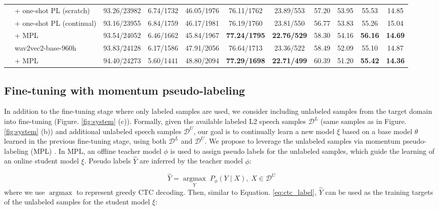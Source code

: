 \documentclass[a4paper]{article}
\begin{document}
\begin{table}[t]
{\begin{tabular}{cl|cc|ccc|ccc|c}
\multicolumn{1}{c|}{}                       & \quad + one-shot PL (scratch)   & 93.26/23982 & 6.74/1732 & 46.05/1976 & 76.11/1762  & 23.89/553  & 57.20 & 53.95 & 55.53 & 14.85 \\
\multicolumn{1}{c|}{}                       & \quad + one-shot PL (continual) & 93.16/23955 & 6.84/1759 & 46.17/1981 & 76.19/1760  & 23.81/550  & 56.77 & 53.83 & 55.26 & 15.04 \\
\multicolumn{1}{c|}{}                       & \quad + MPL                     & 93.54/24052 & 6.46/1662 & 45.84/1967 & \textbf{77.24/1795}  & \textbf{22.76/529}  & 58.30 & 54.16 & \textbf{56.16} & \textbf{14.69} \\ \cline{2-11} 
\multicolumn{1}{c|}{}                       & wav2vec2-base-960h        & 93.83/24128 & 6.17/1586 & 47.91/2056 & 76.64/1713  & 23.36/522  & 58.49 & 52.09 & 55.10 & 14.87 \\
\multicolumn{1}{c|}{}                       & \quad + MPL                     & 94.40/24273 & 5.60/1441 & 48.80/2094 & \textbf{77.29/1698}  & \textbf{22.71/499}  & 60.39 & 51.20 & \textbf{55.42} & \textbf{14.36} \\ \hline
\end{tabular}
}
\end{table}

\subsection{Fine-tuning with momentum pseudo-labeling} \label{sec:ft_mpl}

In addition to the fine-tuning stage where only labeled samples are used, we consider including unlabeled samples from the target domain into fine-tuning (Figure. \ref{fig:system} (c)). Formally, given the available labeled L2 speech samples $\mathcal{D}^L$ (same samples as in Figure. \ref{fig:system} (b)) and additional unlabeled speech samples $\mathcal{D}^U$, our goal is to continually learn a new model $\xi$ based on a base model $\theta$ learned in the previous fine-tuning stage, using both $\mathcal{D}^L$ and $\mathcal{D}^U$. We propose to leverage the unlabeled samples via momentum pseudo-labeling (MPL) \cite{higuchi2021momentum}. In MPL, an offline teacher model $\phi$ is used to assign pseudo labels for the unlabeled samples, which guide the learning of an online student model $\xi$. Pseudo labels $\hat{Y}$ are inferred by the teacher model $\phi$:

\vspace{-1mm}
\begin{equation}
    \hat{Y}=\underset{Y}{\operatorname{argmax}} \; P_{\phi}(Y \mid X), \; X \in \mathcal{D}^{U}
\end{equation}
where we use $\operatorname{argmax}$ to represent greedy CTC decoding. Then, similar to Equation. \ref{eq:ctc_label}, $\hat{Y}$ can be used as the training targets of the unlabeled samples for the student model $\xi$:
\end{document}
